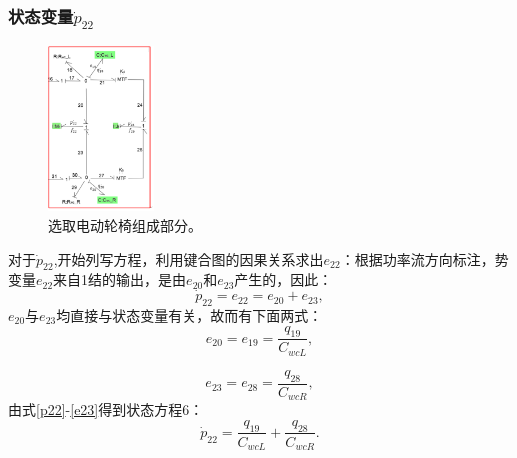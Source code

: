 \subsubsection{状态变量$\dot{ p}_{22} $}
\begin{figure}[H]
	\centering
	\includegraphics[width=0.25\textwidth]{fig/equation6.png}
	\caption{选取电动轮椅组成部分。}\label{fig:equation6}
\end{figure}
对于$\dot{p} _ { 22 }$,开始列写方程，利用键合图的因果关系求出$e_{22}$：根据功率流方向标注，势变量$e_{22}$来自1结的输出，是由$e_{20}$和$e_{23}$产生的，因此：
\begin{equation}\label{p22}
\dot{ p }  _ { 22 } = e _ { 22 } = e _ { 20 } + e _ { 23 },
\end{equation}
$e_{20}$与$e_{23}$均直接与状态变量有关，故而有下面两式：
\begin{equation}
e _ { 20 } = e _ { 19 } = \frac { q _ { 19 } } { C _ { w cL }  },
\end{equation}

\begin{equation}\label{e23}
e _ { 23 } = e _ { 28 } = \frac { q _ { 28 } } { C _ { w c R }  },
\end{equation}
由式\ref{p22}-\ref{e23}得到状态方程6：
\begin{equation}
\dot{ p } _ { 22 } = \frac { q _ { 19 } } { C _ { w c L } } + \frac { q _ { 28 } } { C _ { w c R  } }.
\end{equation}
